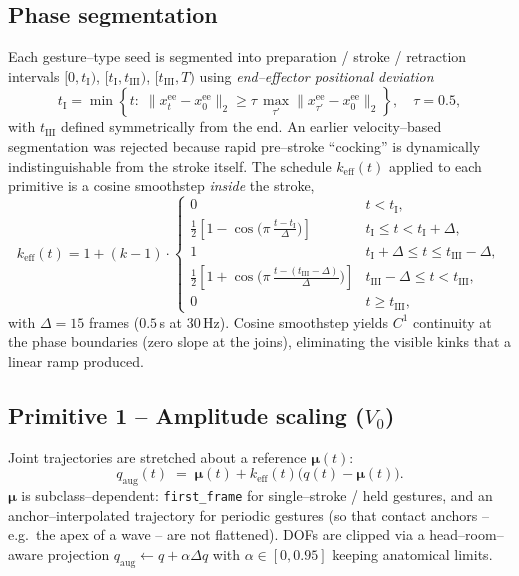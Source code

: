\subsection{Phase segmentation}

Each gesture--type seed is segmented into preparation / stroke / retraction
intervals $[0,t_{\text{I}})$, $[t_{\text{I}},t_{\text{III}})$,
$[t_{\text{III}},T)$ using \emph{end--effector positional deviation}
\begin{equation}
  t_{\text{I}}    = \min\!\left\{t:\;\|x^{\text{ee}}_t-x^{\text{ee}}_0\|_2 \geq \tau\,\max_{\tau'}\|x^{\text{ee}}_{\tau'}-x^{\text{ee}}_0\|_2\right\},
  \quad \tau=0.5,
  \label{eq:phase-seg}
\end{equation}
with $t_{\text{III}}$ defined symmetrically from the end. An earlier
velocity--based segmentation was rejected because rapid pre--stroke
``cocking'' is dynamically indistinguishable from the stroke itself.
The schedule $k_{\text{eff}}(t)$ applied to each primitive is a cosine
smoothstep \emph{inside} the stroke,
\begin{equation}
  k_{\text{eff}}(t)
  = 1 + (k-1)\cdot
  \begin{cases}
    0 & t<t_{\text{I}},\\[2pt]
    \tfrac{1}{2}\!\left[1-\cos\!\bigl(\pi\,\frac{t-t_{\text{I}}}{\Delta}\bigr)\right] & t_{\text{I}}\!\le\!t<t_{\text{I}}\!+\!\Delta,\\[2pt]
    1 & t_{\text{I}}\!+\!\Delta\!\le\!t\le t_{\text{III}}\!-\!\Delta,\\[2pt]
    \tfrac{1}{2}\!\left[1+\cos\!\bigl(\pi\,\frac{t-(t_{\text{III}}\!-\!\Delta)}{\Delta}\bigr)\right] & t_{\text{III}}\!-\!\Delta\!\le\!t<t_{\text{III}},\\[2pt]
    0 & t\ge t_{\text{III}},
  \end{cases}
  \label{eq:ramp}
\end{equation}
with $\Delta\!=\!15$ frames ($0.5\,$s at $30\,$Hz). Cosine smoothstep
yields $C^1$ continuity at the phase boundaries (zero slope at the joins),
eliminating the visible kinks that a linear ramp produced.

\subsection{Primitive 1 -- Amplitude scaling ($V_0$)}

Joint trajectories are stretched about a reference $\boldsymbol\mu(t)$:
\begin{equation}
  q_{\text{aug}}(t) \;=\; \boldsymbol\mu(t) + k_{\text{eff}}(t)\bigl(q(t)-\boldsymbol\mu(t)\bigr).
  \label{eq:p1}
\end{equation}
$\boldsymbol\mu$ is subclass--dependent: \texttt{first\_frame} for
single--stroke / held gestures, and an anchor--interpolated trajectory for
periodic gestures (so that contact anchors -- e.g.\ the apex of a wave --
are not flattened). DOFs are clipped via a head--room--aware projection
$q_{\text{aug}}\!\leftarrow\!q + \alpha\Delta q$ with
$\alpha\in[0,0.95]$ keeping anatomical limits.

